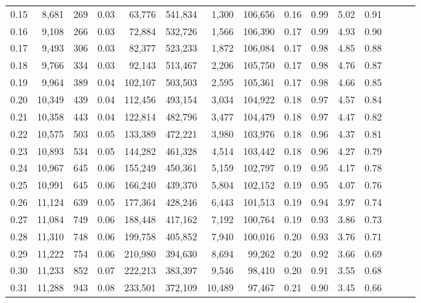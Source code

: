 \begin{tabular}{rrrrrrrrrrrrrrr}
0.15 &   8,681 &    269 &  0.03 &   63,776 &  541,834 &    1,300 &  106,656 &  0.16 &  0.99 &  5.02 &      0.91 \\
0.16 &   9,108 &    266 &  0.03 &   72,884 &  532,726 &    1,566 &  106,390 &  0.17 &  0.99 &  4.93 &      0.90 \\
0.17 &   9,493 &    306 &  0.03 &   82,377 &  523,233 &    1,872 &  106,084 &  0.17 &  0.98 &  4.85 &      0.88 \\
0.18 &   9,766 &    334 &  0.03 &   92,143 &  513,467 &    2,206 &  105,750 &  0.17 &  0.98 &  4.76 &      0.87 \\
0.19 &   9,964 &    389 &  0.04 &  102,107 &  503,503 &    2,595 &  105,361 &  0.17 &  0.98 &  4.66 &      0.85 \\
0.20 &  10,349 &    439 &  0.04 &  112,456 &  493,154 &    3,034 &  104,922 &  0.18 &  0.97 &  4.57 &      0.84 \\
0.21 &  10,358 &    443 &  0.04 &  122,814 &  482,796 &    3,477 &  104,479 &  0.18 &  0.97 &  4.47 &      0.82 \\
0.22 &  10,575 &    503 &  0.05 &  133,389 &  472,221 &    3,980 &  103,976 &  0.18 &  0.96 &  4.37 &      0.81 \\
0.23 &  10,893 &    534 &  0.05 &  144,282 &  461,328 &    4,514 &  103,442 &  0.18 &  0.96 &  4.27 &      0.79 \\
0.24 &  10,967 &    645 &  0.06 &  155,249 &  450,361 &    5,159 &  102,797 &  0.19 &  0.95 &  4.17 &      0.78 \\
0.25 &  10,991 &    645 &  0.06 &  166,240 &  439,370 &    5,804 &  102,152 &  0.19 &  0.95 &  4.07 &      0.76 \\
0.26 &  11,124 &    639 &  0.05 &  177,364 &  428,246 &    6,443 &  101,513 &  0.19 &  0.94 &  3.97 &      0.74 \\
0.27 &  11,084 &    749 &  0.06 &  188,448 &  417,162 &    7,192 &  100,764 &  0.19 &  0.93 &  3.86 &      0.73 \\
0.28 &  11,310 &    748 &  0.06 &  199,758 &  405,852 &    7,940 &  100,016 &  0.20 &  0.93 &  3.76 &      0.71 \\
0.29 &  11,222 &    754 &  0.06 &  210,980 &  394,630 &    8,694 &   99,262 &  0.20 &  0.92 &  3.66 &      0.69 \\
0.30 &  11,233 &    852 &  0.07 &  222,213 &  383,397 &    9,546 &   98,410 &  0.20 &  0.91 &  3.55 &      0.68 \\
0.31 &  11,288 &    943 &  0.08 &  233,501 &  372,109 &   10,489 &   97,467 &  0.21 &  0.90 &  3.45 &      0.66 \\

\end{tabular}
